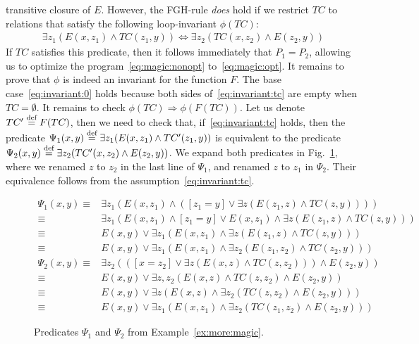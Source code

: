 \begin{ex}
transitive closure of $E$.  However, the FGH-rule {\em does} hold if
we restrict $TC$ to relations that satisfy the following
loop-invariant $\phi(TC)$:
%
\begin{align}
  \exists z_1 (E(x,z_1)\wedge TC(z_1,y))\Leftrightarrow \exists z_2 (TC(x,z_2)\wedge E(z_2,y)) \label{eq:invariant:tc}
\end{align}
%
If $TC$ satisfies this predicate, then it follows immediately that
$P_1=P_2$, allowing us to optimize the program~\eqref{eq:magic:nonopt}
to~\eqref{eq:magic:opt}.  It remains to prove that $\phi$ is indeed an
invariant for the function $F$.  The base case~\eqref{eq:invariant:0}
holds because both sides of~\eqref{eq:invariant:tc} are empty when
$TC=\emptyset$.  It remains to check
$\phi(TC)\Rightarrow \phi(F(TC))$.  Let us denote $TC'\stackrel{\text{def}}{=} F(TC)$,
then we need to check that, if~\eqref{eq:invariant:tc} holds, then the
predicate $\Psi_1(x,y) \stackrel{\text{def}}{=} \exists z_1 (E(x,z_1)\wedge TC'(z_1,y))$
is equivalent to the predicate
$\Psi_2(x,y) \stackrel{\text{def}}{=} \exists z_2 (TC'(x,z_2)\wedge E(z_2,y))$.  We
expand both predicates in Fig.~\ref{fig:more:magic:1:2}, where we
renamed $z$ to $z_2$ in the last line of $\Psi_1$, and renamed $z$ to
$z_1$ in $\Psi_2$.  Their equivalence follows from the
assumption~\eqref{eq:invariant:tc}.
\end{ex}

\begin{figure}
\footnotesize
\begin{align*}
\Psi_1(x,y)
  \equiv & \exists z_1 \left(E(x,z_1)\wedge \left(
                [z_1=y] \vee \exists z(E(z_1,z) \wedge TC(z,y))
                \right)\right)\\
  \equiv & \exists z_1 \left(E(x,z_1)\wedge [z_1=y]  \vee E(x,z_1)\wedge \exists z(E(z_1,z) \wedge TC(z,y))\right)\\
  \equiv & E(x,y) \vee \exists z_1 (E(x,z_1) \wedge \exists z(E(z_1,z) \wedge TC(z,y)))\\
  \equiv & E(x,y) \vee \exists z_1 (E(x,z_1) \wedge \exists z_2(E(z_1,z_2) \wedge TC(z_2,y)))\\
  \Psi_2(x,y) \equiv &  \exists z_2  \left(
                \left([x=z_2] \vee \exists z(E(x,z) \wedge TC(z,z_2))\right)
                \wedge E(z_2,y)
                \right) \\
  \equiv & E(x,y) \vee \exists z, z_2 (E(x,z) \wedge TC(z,z_2) \wedge E(z_2,y))\\
  \equiv & E(x,y) \vee \exists z (E(x,z) \wedge \exists z_2(TC(z,z_2) \wedge E(z_2,y)))\\
  \equiv & E(x,y) \vee \exists z_1 (E(x,z_1) \wedge \exists z_2(TC(z_1,z_2) \wedge E(z_2,y)))
\end{align*}
\caption{Predicates $\Psi_1$ and $\Psi_2$ from Example~\ref{ex:more:magic}.}
  \label{fig:more:magic:1:2}
\end{figure}

